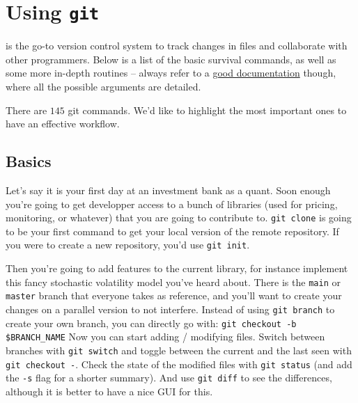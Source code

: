 \section{Using \texttt{git}}

\begin{tcolorbox}[width=\linewidth, sharp corners=all, colback=white!95!black]
     is the go-to version control system to track changes in files and collaborate with other programmers.
    Below is a list of the basic survival commands, as well as some more in-depth routines -- always refer to a \href{https://git-scm.com/docs}{good documentation} though, where all the possible arguments are detailed.
\end{tcolorbox}

There are $145$ git commands. We'd like to highlight the most important ones to have an effective workflow.

\subsection*{Basics}

Let's say it is your first day at an investment bank as a quant. Soon enough you're going to get developper access to a bunch of libraries (used for pricing, monitoring, or whatever) that you are going to contribute to.\newline
\texttt{git clone}\newline
is going to be your first command to get your local version of the remote repository. If you were to create a new repository, you'd use \texttt{git init}.

Then you're going to add features to the current library, for instance implement this fancy stochastic volatility model you've heard about. There is the \texttt{main} or \texttt{master} branch that everyone takes as reference, and you'll want to create your changes on a parallel version to not interfere. Instead of using \texttt{git branch} to create your own branch, you can directly go with:\newline
\texttt{git checkout -b \$BRANCH_NAME}\newline
Now you can start adding / modifying files. Switch between branches with \texttt{git switch} and toggle between the current and the last seen with \texttt{git checkout -}. Check the state of the modified files with \texttt{git status} (and add the \texttt{-s} flag for a shorter summary). And use \texttt{git diff} to see the differences, although it is better to have a nice GUI for this.

